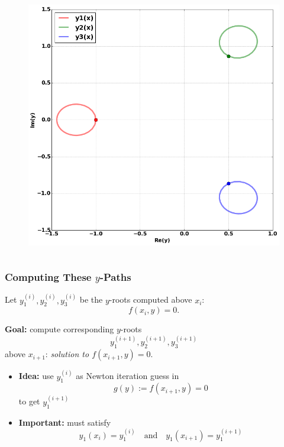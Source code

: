 \documentclass{beamer}
\begin{document}
\begin{frame}
\begin{columns}
  \begin{column}{0.7\textwidth}
  \begin{figure}
    \centering
    \includegraphics[width=\textwidth]{images/ancontsimple2.png}
  \end{figure}
  \end{column}
  \end{columns}
\end{frame}


\begin{frame}
  \frametitle{Computing These $y$-Paths}

  Let $y_1^{(i)},y_2^{(i)},y_3^{(i)}$ be the $y$-roots computed above
  $x_i$:
  \[
  f(x_i,y) = 0.
  \]

  \pause

  {\bf Goal:} compute corresponding $y$-roots
  \[
  y_1^{(i+1)},y_2^{(i+1)},y_3^{(i+1)}
  \]
  above $x_{i+1}$: {\it solution to $f(x_{i+1},y) = 0$}.

  \begin{itemize}
  \item<3-> {\bf Idea:} use $y_1^{(i)}$ as Newton iteration guess in
    \[
    g(y) := f(x_{i+1}, y) = 0
    \]
    to get $y_1^{(i+1)}$
  \item<4-> {\bf Important:} must satisfy
    \[
    y_1(x_i) = y_1^{(i)} \quad \text{and} \quad y_1(x_{i+1}) = y_1^{(i+1)}
    \]
  \end{itemize}
\end{frame}
\end{document}
